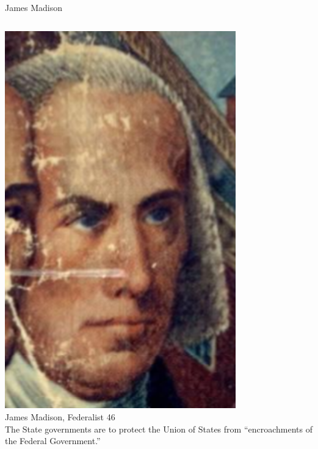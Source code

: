 \begin{frame}{James Madison}
    \begin{columns}[onlytextwidth]
            \centering
            \includegraphics[width=0.75\textwidth]{img/madison-2.png} \\
            James Madison, Federalist 46 \\
            The State governments are to protect the Union of States from ``encroachments of the Federal Government.''
    \end{columns}
\end{frame}

